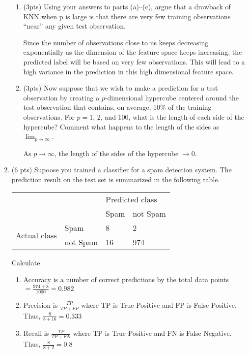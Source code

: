 \documentclass[a4paper]{article}
\theoremstyle{definition}
\newenvironment{soln}{
    \leavevmode\color{blue}\ignorespaces
}{}
\begin{document}
\begin{enumerate}
\begin{enumerate}
	\item (3pts) Using your answers to parts (a)–(c), argue that a drawback of KNN when p is large is that there are very few training observations “near” any given test observation.
	
	\begin{soln}
	Since the number of observations close to us keeps decreasing exponentially as the dimension of the feature space keeps increasing, the predicted label will be based on very few observations. This will lead to a high variance in the prediction in this high dimensional feature space.
	\end{soln}
	
	\item (3pts) Now suppose that we wish to make a prediction for a test observation by creating a $p$-dimensional hypercube centered around the test observation that contains, on average, 10\% of the training observations. For $p =$1, 2, and 100, what is the length of each side of the hypercube? Comment what happens to the length of the sides as $\lim_{{p \to \infty}}$.
	
	\begin{soln}
		As $p \to \infty$, the length of the sides of the hypercube $\to 0$.
	\end{soln}
	
\end{enumerate}

\item (6 pts) Supoose you trained a classifier for a spam detection system. The prediction result on the test set is summarized in the following table.
\begin{center}
	\begin{tabular}{l l | l l}
		&          & \multicolumn{2}{l}{Predicted class} \\
		&          & Spam           & not Spam           \\
		\hline
		\multirow{2}{*}{Actual class} & Spam     & 8              & 2                  \\
		& not Spam & 16             & 974               
	\end{tabular}
\end{center}

Calculate
\begin{enumerate}
	\item
	\begin{soln} 
	Accuracy is a number of correct predictions by the total data points $ = \frac{974 + 8}{1000} = 0.982$
	\end{soln}
	\item 
	\begin{soln}
	Precision is $\frac{TP}{TP + FP}$ where TP is True Positive and FP is False Positive. Thus, $\frac{8}{8 + 16} = 0.333$
	\end{soln}
	\item
	\begin{soln}
	Recall is $\frac{TP}{TP + FN}$ where TP is True Positive and FN is False Negative. Thus, $\frac{8}{8 + 2} = 0.8$
	\end{soln}
\end{enumerate}



\end{enumerate}
\end{document}
